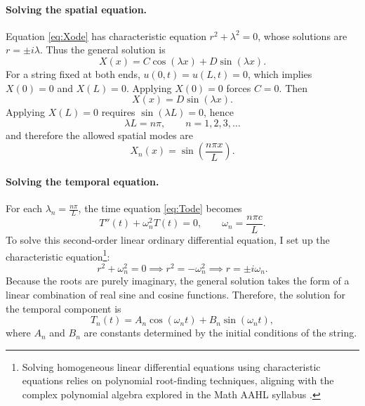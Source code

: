 \documentclass{article}
\begin{document}
\paragraph{Solving the spatial equation.}
Equation \eqref{eq:Xode} has characteristic equation $r^2 + \lambda^2 = 0$, whose solutions are $r = \pm i\lambda$. Thus the general solution is
\begin{equation}
    X(x) = C \cos(\lambda x) + D \sin(\lambda x).
\end{equation}
For a string fixed at both ends, $u(0,t)=u(L,t)=0$, which implies $X(0)=0$ and $X(L)=0$. Applying $X(0)=0$ forces $C=0$. Then
\begin{equation}
    X(x) = D \sin(\lambda x).
\end{equation}
Applying $X(L)=0$ requires $\sin(\lambda L)=0$, hence
\begin{equation}
    \lambda L = n\pi, \qquad n=1,2,3,\dots
\end{equation}
and therefore the allowed spatial modes are
\begin{equation}
    X_n(x) = \sin\!\left(\frac{n\pi x}{L}\right).
\end{equation}

\paragraph{Solving the temporal equation.}
For each $\lambda_n = \tfrac{n\pi}{L}$, the time equation \eqref{eq:Tode} becomes
\begin{equation}
    T''(t) + \omega_n^2 T(t) = 0, \qquad \omega_n = \frac{n\pi c}{L}.
\end{equation}
To solve this second-order linear ordinary differential equation, I set up the characteristic equation\footnote{Solving homogeneous linear differential equations using characteristic equations relies on polynomial root-finding techniques, aligning with the complex polynomial algebra explored in the Math AAHL syllabus \cite{haese_math_hl}.}:
\begin{equation}
    r^2 + \omega_n^2 = 0 \implies r^2 = -\omega_n^2 \implies r = \pm i\omega_n.
\end{equation}
Because the roots are purely imaginary, the general solution takes the form of a linear combination of real sine and cosine functions. Therefore, the solution for the temporal component is
\begin{equation}
    T_n(t) = A_n \cos(\omega_n t) + B_n \sin(\omega_n t),
\end{equation}
where $A_n$ and $B_n$ are constants determined by the initial conditions of the string.
\end{document}

